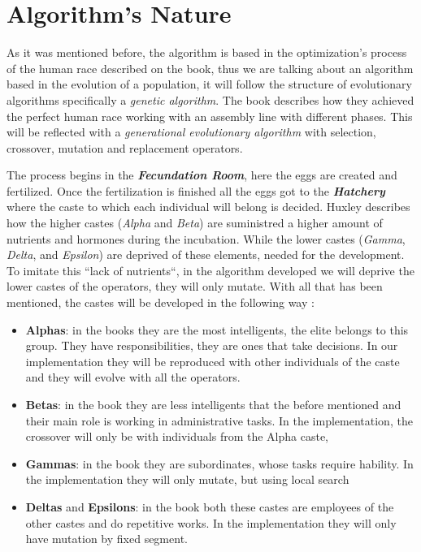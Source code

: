 \section{Algorithm's Nature}
\label{sec:algorithm}

As it was mentioned before, the algorithm is based in the optimization's process of the human race described on the book, thus we
are talking about an algorithm based in the evolution of a population, it will follow the structure of evolutionary algorithms
specifically a \textit{genetic algorithm}. The book describes how they achieved the perfect human race working with an assembly 
line with different phases. This will be reflected with a \textit{generational evolutionary algorithm} with selection, 
crossover, mutation and replacement operators.

The process begins in the \textbf{\textit{Fecundation Room}}, here the eggs are created and fertilized. Once the fertilization
is finished all the eggs got to the \textbf{\textit{Hatchery}} where the caste to which each individual will belong is decided. 
Huxley describes how the higher castes (\textit{Alpha} and \textit{Beta}) are suministred a higher amount of nutrients and hormones during the 
incubation. While the lower castes (\textit{Gamma}, \textit{Delta}, and \textit{Epsilon}) are deprived of these elements, needed for the development.
To imitate this ``lack of nutrients``, in the algorithm developed we will deprive the lower castes of the operators, they will only mutate. 
With all that has been mentioned, the castes will be developed in the following way :

\begin{itemize}
    \item \textbf{Alphas}: in the books they are the most intelligents, the elite belongs to this group. They have responsibilities, they are
    ones that take decisions. In our implementation they will be reproduced with other individuals of the caste and they will evolve with
    all the operators.
    \item \textbf{Betas}: in the book they are less intelligents that the before mentioned and their main role is working in administrative tasks.
    In the implementation, the crossover will only be with individuals from the Alpha caste,
    \item \textbf{Gammas}: in the book they are subordinates, whose tasks require hability. In the implementation they will only mutate, but using local
    search
    \item \textbf{Deltas} and \textbf{Epsilons}: in the book both these castes are employees of the other castes and do repetitive works. In the 
    implementation they will only have mutation by fixed segment. 
\end{itemize}

